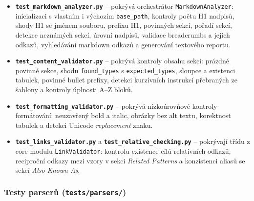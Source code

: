 \documentclass[12pt, a4paper]{article}
\begin{document}
\begin{itemize}
    \item \textbf{\texttt{test\_markdown\_analyzer.py}} -- pokrývá orchestrátor
    \texttt{MarkdownAnalyzer}: inicializaci s vlastním i výchozím \texttt{base\_path},
    kontroly počtu H1 nadpisů, shody H1 se jménem souboru, prefixu H1, povinných sekcí,
    pořadí sekcí, detekce neznámých sekcí, úrovní nadpisů, validace breadcrumbs a jejich
    odkazů, vyhledávání markdown odkazů a generování textového reportu.

    \item \textbf{\texttt{test\_content\_validator.py}} -- pokrývá kontroly obsahu sekcí:
    prázdné povinné sekce, shodu \texttt{found\_types} s \texttt{expected\_types},
    sloupce a existenci tabulek, povinné bullet prefixy, detekci kurzívních instrukcí
    přebraných ze šablony a kontroly úplnosti A--Z bloků.

    \item \textbf{\texttt{test\_formatting\_validator.py}} -- pokrývá nízkoúrovňové kontroly
    formátování: neuzavřený bold a italic, obrázky bez alt textu, korektnost tabulek
    a detekci Unicode \emph{replacement} znaku.

    \item \textbf{\texttt{test\_links\_validator.py}} a \textbf{\texttt{test\_relative\_checking.py}} --
    pokrývají třídu z core modulu \texttt{LinkValidator}: kontrolu existence cílů relativních odkazů,
    reciproční odkazy mezi vzory v sekci \emph{Related Patterns} a konzistenci aliasů
    se sekcí \emph{Also Known As}.
\end{itemize}

\subsubsection*{Testy parserů (\texttt{tests/parsers/})}
\end{document}
